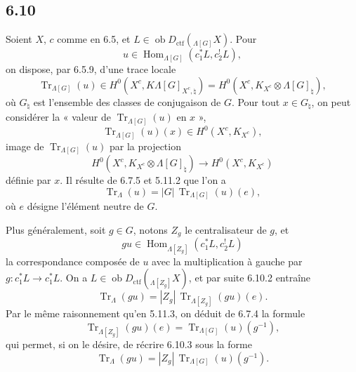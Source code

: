 \documentclass[11pt]{article}
\DeclareMathOperator{\Hom}{Hom}
\providecommand{\Tr}{\operatorname{Tr}}
\providecommand{\Tr}{\operatorname{Tr}}
\providecommand{\Ob}{\operatorname{ob}}
\providecommand{\Tr}{\operatorname{Tr}}
\providecommand{\Hom}{\operatorname{Hom}}
\providecommand{\Ob}{\operatorname{ob}}
\providecommand{\Tr}{\operatorname{Tr}}
\providecommand{\Ob}{\operatorname{Ob}}
\providecommand{\Hom}{\operatorname{Hom}}
\providecommand{\Tr}{\operatorname{Tr}}
\providecommand{\Ob}{\operatorname{ob}}
\providecommand{\Ob}{\operatorname{Ob}}
\begin{document}
\subsection*{6.10}
Soient $X$, $c$ comme en 6.5, et $L\in\Ob D_{\mathrm{ctf}}({}_{\Lambda[G]}X)$. Pour
\[
u\in\Hom_{\Lambda[G]}(c_1^*L,c_2^!L),
\]
on dispose, par 6.5.9, d'une trace locale
\begin{equation}
\Tr_{\Lambda[G]}(u)\in
H^0(X^c,K\Lambda[G]_{X^c,\natural})
=H^0(X^c,K_{X^c}\otimes\Lambda[G]_{\natural}),
\tag{6.10.1}
\end{equation}
où $G_{\natural}$ est l'ensemble des classes de conjugaison de $G$. Pour tout $x\in G_{\natural}$, on peut considérer la « valeur de $\Tr_{\Lambda[G]}(u)$ en $x$ »,
\[
\Tr_{\Lambda[G]}(u)(x)\in H^0(X^c,K_{X^c}),
\]
image de $\Tr_{\Lambda[G]}(u)$ par la projection
\[
H^0(X^c,K_{X^c}\otimes\Lambda[G]_{\natural})
\longrightarrow H^0(X^c,K_{X^c})
\]
définie par $x$. Il résulte de 6.7.5 et 5.11.2 que l'on a
\begin{equation}
\Tr_{\Lambda}(u)=|G|\,\Tr_{\Lambda[G]}(u)(e),
\tag{6.10.2}
\end{equation}
où $e$ désigne l'élément neutre de $G$.

Plus généralement, soit $g\in G$, notons $Z_g$ le centralisateur de $g$, et
\[
gu\in\Hom_{\Lambda[Z_g]}(c_1^*L,c_2^!L)
\]
la correspondance composée de $u$ avec la multiplication à gauche par $g:c_1^*L\to c_1^*L$. On a $L\in\Ob D_{\mathrm{ctf}}({}_{\Lambda[Z_g]}X)$, et par suite 6.10.2 entraîne
\begin{equation}
\Tr_{\Lambda}(gu)=|Z_g|\,\Tr_{\Lambda[Z_g]}(gu)(e).
\tag{6.10.3}
\end{equation}
Par le même raisonnement qu'en 5.11.3, on déduit de 6.7.4 la formule
\begin{equation}
\Tr_{\Lambda[Z_g]}(gu)(e)=\Tr_{\Lambda[G]}(u)(g^{-1}),
\tag{6.10.4}
\end{equation}
qui permet, si on le désire, de récrire 6.10.3 sous la forme
\begin{equation}
\Tr_{\Lambda}(gu)=|Z_g|\,\Tr_{\Lambda[G]}(u)(g^{-1}).
\tag{6.10.5}
\end{equation}
\end{document}
